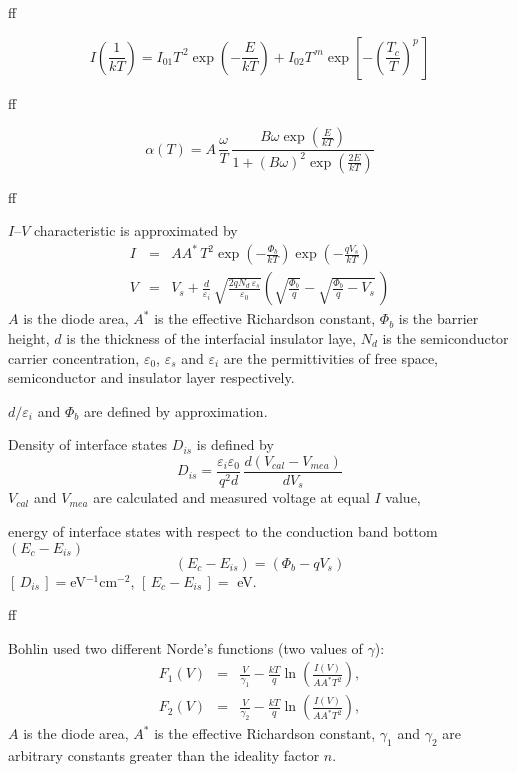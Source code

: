 \documentclass[14pt]{article}
\numberwithin{equation}{part}
\begin{document}
ff

\begin{equation*}
    I\left(\frac{1}{kT}\right)=I_{01}T^{\,2}\exp\left(-\frac{E}{kT}\right)+
       I_{02}T^{\,m}\exp\left[-\left(\frac{T_c}{T}\right)^{\!p}\,\right]
\end{equation*}

ff

\begin{equation*}
    \alpha(T)=A \,\frac{\omega}{T} \,\frac{B\omega\exp\left(\frac{E}{kT}\right)}{1+(B\omega)^2\exp\left(\frac{2E}{kT}\right)}
\end{equation*}

ff
\pagebreak

$I$--$V$ characteristic is approximated by
\begin{eqnarray*}
I&=&AA^*\,T^2\exp\left(-\frac{\Phi_b}{kT}\right)\exp\left(-\frac{qV_s}{kT}\right)\\
V&=&V_s+\frac{d}{\varepsilon_i}\,\sqrt{\frac{2qN_d\,\varepsilon_s}{\varepsilon_0}}\left(\sqrt{\frac{\Phi_b}{q}}-\sqrt{\frac{\Phi_b}{q}-V_s}\,\right)
\end{eqnarray*}
$A$ is the diode area,
$A^*$ is the effective Richardson constant,
$\Phi_b$ is the barrier height,
$d$ is the thickness of the interfacial insulator laye,
$N_d$ is the semiconductor carrier concentration,
$\varepsilon_0$, $\varepsilon_s$ and $\varepsilon_i$ are the permittivities of free space, semiconductor and insulator layer respectively.

$d/\varepsilon_i$ and $\Phi_b$ are defined by approximation.

Density of interface states $D_{is}$ is defined by
\begin{equation*}
    D_{is}=\frac{\varepsilon_i\varepsilon_0}{q^2d}\,\frac{d(V_{cal}-V_{mea})}{d V_s}
\end{equation*}
$V_{cal}$ and $V_{mea}$ are calculated and measured voltage at equal $I$ value,

\noindent
energy of interface states with respect to the conduction band bottom $(E_c-E_{is})$
\begin{equation*}
    (E_c-E_{is})=(\Phi_b-qV_s)
\end{equation*}
$[\,D_{is}\,]= $eV$^{-1}$cm$^{-2}$, $[\,E_c-E_{is}\,]=$ eV.


ff
\pagebreak

Bohlin used two different Norde's functions (two values of $\gamma$):
\begin{eqnarray}
\label{eqBohlin}
F_1(V)&=&\frac{V}{\gamma_1}-\frac{kT}{q}\ln\left(\frac{I(V)}{AA^*T^2}\right),
\nonumber\\
F_2(V)&=&\frac{V}{\gamma_2}-\frac{kT}{q}\ln\left(\frac{I(V)}{AA^*T^2}\right),\nonumber
\end{eqnarray}
$A$ is the diode area,
$A^*$ is the effective Richardson constant,
$\gamma_1$ and $\gamma_2$ are arbitrary constants greater than the ideality factor $n$.
\end{document}
